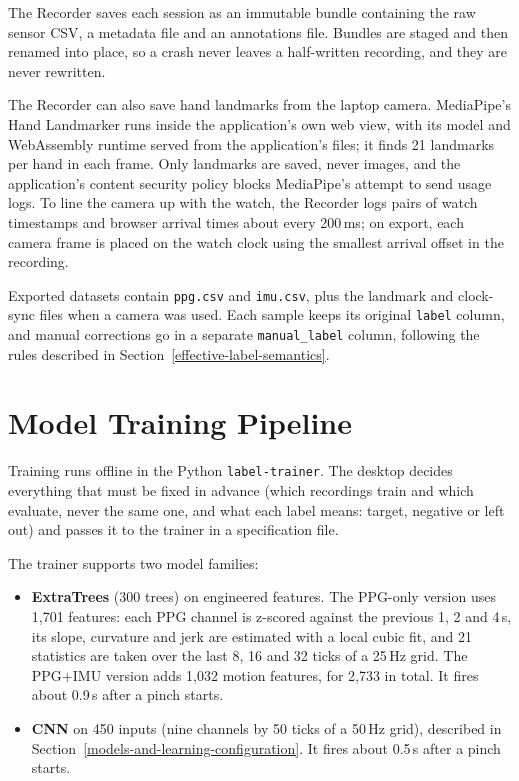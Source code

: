 The Recorder saves each session as an immutable bundle containing the raw sensor CSV, a metadata file and an annotations file. Bundles are staged and then renamed into place, so a crash never leaves a half-written recording, and they are never rewritten.

The Recorder can also save hand landmarks from the laptop camera. MediaPipe's Hand Landmarker runs inside the application's own web view, with its model and WebAssembly runtime served from the application's files; it finds 21 landmarks per hand in each frame. Only landmarks are saved, never images, and the application's content security policy blocks MediaPipe's attempt to send usage logs. To line the camera up with the watch, the Recorder logs pairs of watch timestamps and browser arrival times about every 200\,ms; on export, each camera frame is placed on the watch clock using the smallest arrival offset in the recording.

Exported datasets contain \texttt{ppg.csv} and \texttt{imu.csv}, plus the landmark and clock-sync files when a camera was used. Each sample keeps its original \texttt{label} column, and manual corrections go in a separate \texttt{manual\_label} column, following the rules described in Section~\ref{effective-label-semantics}.

\section{Model Training Pipeline}

Training runs offline in the Python \texttt{label-trainer}. The desktop decides everything that must be fixed in advance (which recordings train and which evaluate, never the same one, and what each label means: target, negative or left out) and passes it to the trainer in a specification file.

The trainer supports two model families:
\begin{itemize}
\item \textbf{ExtraTrees} (300 trees) on engineered features. The PPG-only version uses 1,701 features: each PPG channel is z-scored against the previous 1, 2 and 4\,s, its slope, curvature and jerk are estimated with a local cubic fit, and 21 statistics are taken over the last 8, 16 and 32 ticks of a 25\,Hz grid. The PPG+IMU version adds 1,032 motion features, for 2,733 in total. It fires about 0.9\,s after a pinch starts.
\item \textbf{CNN} on 450 inputs (nine channels by 50 ticks of a 50\,Hz grid), described in Section~\ref{models-and-learning-configuration}. It fires about 0.5\,s after a pinch starts.
\end{itemize}

